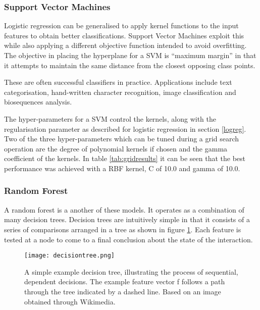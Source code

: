 \subsubsection*{Support Vector Machines}
Logistic regression can be generalised to apply kernel functions to the input features to obtain better classifications.
Support Vector Machines exploit this while also applying a different objective function intended to avoid overfitting\autocite[383]{murphy_machine_2012}.
The objective in placing the hyperplane for a \ac{SVM} is ``maximum margin'' in that it attempts to maintain the same distance from the closest opposing class points.

These are often successful classifiers in practice.
Applications include text categorisation, hand-written character recognition, image classification and biosequences analysis\autocite{cristianini_introduction_2000}.

The hyper-parameters for a SVM control the kernels, along with the regularisation parameter as described for logistic regression in section \ref{logreg}.
Two of the three hyper-parameters which can be tuned during a grid search operation are the degree of polynomial kernels if chosen and the gamma coefficient of the kernels.
In table \ref{tab:gridresults} it can be seen that the best performance was achieved with a \ac{RBF} kernel, C of 10.0 and gamma of 10.0.

\subsubsection*{Random Forest}
\label{randomforest}

A random forest is a another of these models.
It operates as a combination of many decision trees.
Decision trees are intuitively simple in that it consists of a series of comparisons arranged in a tree as shown in figure \ref{fig:dectree}.
Each feature is tested at a node to come to a final conclusion about the state of the interaction.

\begin{figure}
    \centering
    \texttt{[image: decisiontree.png]}
    \caption{A simple example decision tree, illustrating the process of sequential, dependent decisions. The example feature vector f follows a path through the tree indicated by a dashed line. Based on an image obtained through Wikimedia\autocite{wkmdacommons}.}
    \label{fig:dectree}
\end{figure}

